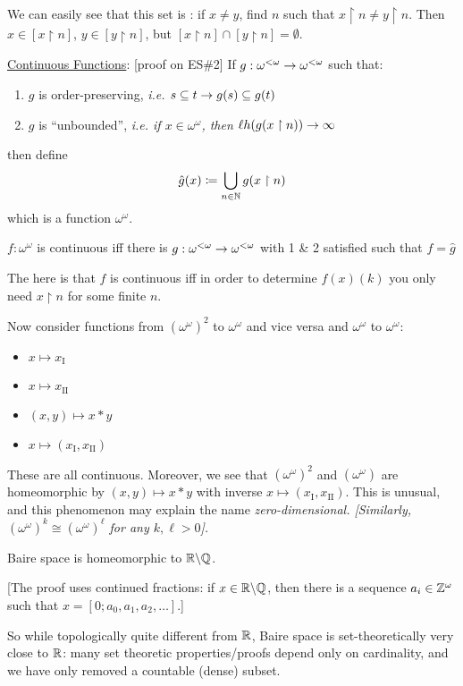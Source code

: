 \documentclass[]{article}
\newcommand{\I}{\textrm{I}}
\newcommand{\II}{\textrm{II}}
\newcommand{\om}{\omega}
\newcommand{\lom}{{<\omega}}
\newcommand{\lh}{\ell h}
\begin{document}
We can easily see that this set is : if $x \ne y$, find $n$ such that $x\restriction n \ne y \restriction n$. Then $x \in [x\restriction n]$, $y \in [y\restriction n]$, but $[x\restriction n]\cap[y\restriction n] = \emptyset$.

\underline{Continuous Functions}: [proof on ES\#2] If $g:\om^\lom \ra \om^\lom$ such that:
\begin{enumerate}
    \item $g$ is order-preserving, \it{i.e.} $s\subseteq t \rightarrow g(s)\subseteq g(t)$
    \item $g$ is ``unbounded'', \it{i.e.} if $x \in \om^\om$, then $\lh(g(x\restriction n))\ra\infty$
\end{enumerate}
then define $$\hat{g}(x) \coloneqq \bigcup_{n\in \mathbb{N}}g(x\restriction n)$$ which is a function $\om^\om$.

\begin{remark*}[Proposition]
    $f:\om^\om$ is continuous iff there is $g:\om^\lom \ra \om^\lom$ with 1 \& 2 satisfied such that $f = \hat{g}$
\end{remark*}

The  here is that $f$ is continuous iff in order to determine $f(x)(k)$ you only need $x\restriction n$ for some finite $n$.

Now consider functions from $(\om^\om)^2$ to $\om^\om$ and vice versa and $\om^\om$ to $\om^\om$:
\begin{itemize}
    \item $x \mapsto x_\I$
    \item $x \mapsto x_{\II}$
    \item $(x,y)\mapsto x\ast y$
    \item $x \mapsto (x_\I,x_\II)$
\end{itemize}
These are all continuous. Moreover, we see that $(\om^\om)^2$ and $(\om^\om)$ are homeomorphic by $(x,y)\mapsto x\ast y$ with inverse $x\mapsto (x_\I,x_\II)$. This is unusual, and this phenomenon may explain the name \it{zero-dimensional}. [Similarly, $(\om^\om)^k \cong (\om^\om)^\ell$ for any $k,\ell > 0$]. 

\begin{theorem*}
    Baire space is homeomorphic to $\mathbb{R}\backslash \mathbb{Q}$.
\end{theorem*}
[The proof uses continued fractions: if $x \in \mathbb{R}\backslash \mathbb{Q}$, then there is a sequence $a_i \in \Z^\om$ such that $x = [0;a_0,a_1,a_2,\dots]$.]

So while topologically quite different from $\mathbb{R}$, Baire space is set-theoretically very close to $\mathbb{R}$: many set theoretic properties/proofs depend only on cardinality, and we have only removed a countable (dense) subset.
\end{document}
